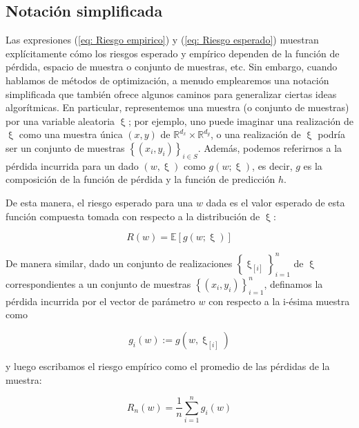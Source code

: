 \subsection{Notaci\'on simplificada}
Las expresiones (\ref{eq: Riesgo empirico}) y (\ref{eq: Riesgo esperado}) muestran expl\'icitamente c\'omo los riesgos esperado y emp\'irico dependen de la funci\'on de p\'erdida, espacio de muestra o conjunto de muestras, etc. Sin embargo, cuando hablamos de m\'etodos de optimizaci\'on, a menudo emplearemos una notaci\'on simplificada que tambi\'en ofrece algunos caminos para generalizar ciertas ideas algor\'itmicas. En particular, representemos una muestra (o conjunto de muestras) por una variable aleatoria $\upxi$; por ejemplo, uno puede imaginar una realizaci\'on de $\upxi$ como una muestra \'unica $(x, y)$ de $\mathbb{R}^{d_x} \times \mathbb{R}^{d_y}$, o una realizaci\'on de $\upxi$ podr\'ia ser un conjunto de muestras $\left\lbrace(x_i, y_i)\right\rbrace_{i \in S}$. Adem\'as, podemos referirnos a la p\'erdida incurrida para un dado $(w, \upxi)$ como $g (w; \upxi )$, es decir, $g$ es la composici\'on de la funci\'on de p\'erdida y la funci\'on de predicci\'on $h$.

De esta manera, el riesgo esperado para una $w$ dada es el valor esperado de esta funci\'on compuesta tomada con respecto a la distribuci\'on de $\upxi$:

\begin{equation}
\label{Riesgo esperado 3}
R(w) = \mathbb{E} \left [ g(w; \upxi) \right ]
\end{equation}

De manera similar, dado un conjunto de realizaciones $\left\lbrace \upxi_{\left [ i \right ]} \right\rbrace _{i=1}^{n}$ de $\upxi$ correspondientes a un conjunto de muestras $\left\lbrace (x_i, y_i) \right\rbrace_{i=1}^{n}$, definamos la p\'erdida incurrida por el vector de par\'ametro $w$ con respecto a la i-\'esima muestra como

\begin{equation}
\label{funci\'on p\'erdida de w}
g_i (w) := g(w, \upxi_{\left [ i \right ]})
\end{equation}

y luego escribamos el riesgo emp\'irico como el promedio de las p\'erdidas de la muestra:

\begin{equation}
\label{Riesgo empirico 3}
R_n(w) = \frac{1}{n}\sum\limits_{i=1}^{n} g_i (w)
\end{equation}

